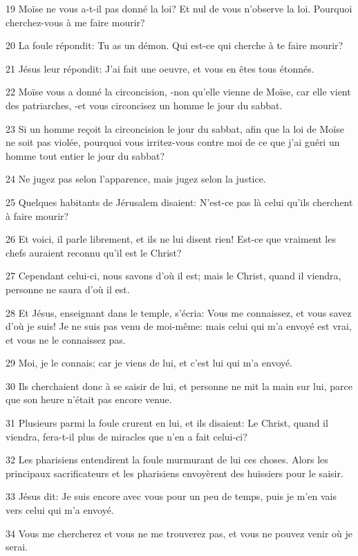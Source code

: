 \par 19 Moïse ne vous a-t-il pas donné la loi? Et nul de vous n'observe la loi. Pourquoi cherchez-vous à me faire mourir?
\par 20 La foule répondit: Tu as un démon. Qui est-ce qui cherche à te faire mourir?
\par 21 Jésus leur répondit: J'ai fait une oeuvre, et vous en êtes tous étonnés.
\par 22 Moïse vous a donné la circoncision, -non qu'elle vienne de Moïse, car elle vient des patriarches, -et vous circoncisez un homme le jour du sabbat.
\par 23 Si un homme reçoit la circoncision le jour du sabbat, afin que la loi de Moïse ne soit pas violée, pourquoi vous irritez-vous contre moi de ce que j'ai guéri un homme tout entier le jour du sabbat?
\par 24 Ne jugez pas selon l'apparence, mais jugez selon la justice.
\par 25 Quelques habitants de Jérusalem disaient: N'est-ce pas là celui qu'ils cherchent à faire mourir?
\par 26 Et voici, il parle librement, et ils ne lui disent rien! Est-ce que vraiment les chefs auraient reconnu qu'il est le Christ?
\par 27 Cependant celui-ci, nous savons d'où il est; mais le Christ, quand il viendra, personne ne saura d'où il est.
\par 28 Et Jésus, enseignant dans le temple, s'écria: Vous me connaissez, et vous savez d'où je suis! Je ne suis pas venu de moi-même: mais celui qui m'a envoyé est vrai, et vous ne le connaissez pas.
\par 29 Moi, je le connais; car je viens de lui, et c'est lui qui m'a envoyé.
\par 30 Ils cherchaient donc à se saisir de lui, et personne ne mit la main sur lui, parce que son heure n'était pas encore venue.
\par 31 Plusieurs parmi la foule crurent en lui, et ils disaient: Le Christ, quand il viendra, fera-t-il plus de miracles que n'en a fait celui-ci?
\par 32 Les pharisiens entendirent la foule murmurant de lui ces choses. Alors les principaux sacrificateurs et les pharisiens envoyèrent des huissiers pour le saisir.
\par 33 Jésus dit: Je suis encore avec vous pour un peu de temps, puis je m'en vais vers celui qui m'a envoyé.
\par 34 Vous me chercherez et vous ne me trouverez pas, et vous ne pouvez venir où je serai.

